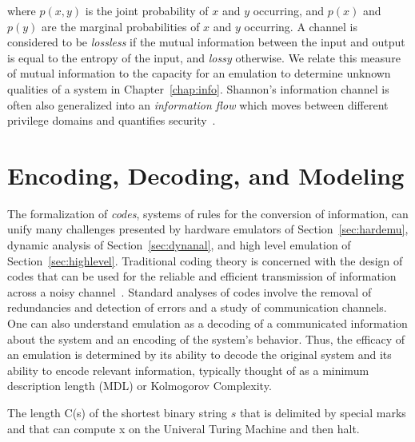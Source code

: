 \noindent
where $p(x,y)$ is the joint probability of $x$ and $y$ occurring, and $p(x)$ and $p(y)$ are the marginal probabilities of $x$ and $y$ occurring.
A channel is considered to be \emph{lossless} if the mutual information between the input and output is equal to the entropy of the input, and \emph{lossy} otherwise.
We relate this measure of mutual information to the capacity for an emulation to determine unknown qualities of a system in Chapter~\ref{chap:info}.
Shannon's information channel is often also generalized into an \emph{information flow} which moves between different privilege domains and quantifies security~\cite{sabelfeld2003language, lowe2002quantifying}.

\section{Encoding, Decoding, and Modeling}
\label{sec:encdec}

The formalization of \emph{codes}, systems of rules for the conversion of information, can unify many challenges presented by hardware emulators of Section~\ref{sec:hardemu}, dynamic analysis of Section~\ref{sec:dynanal}, and high level emulation of Section~\ref{sec:highlevel}.
Traditional coding theory is concerned with the design of codes that can be used for the reliable and efficient transmission of information across a noisy channel~\cite{van1971coding, richardson2008modern, bierbrauer2016introduction}.
Standard analyses of codes involve the removal of redundancies and detection of errors and a study of communication channels.
One can also understand emulation as a decoding of a communicated information about the system and an encoding of the system's behavior.
Thus, the efficacy of an emulation is determined by its ability to decode the original system and its ability to encode relevant information, typically thought of as a minimum description length (MDL) or Kolmogorov Complexity.

\begin{definition}
The length C(s) of the shortest binary string $s$ that is delimited by special marks and that can compute x on the Univeral Turing Machine and then halt.
\end{definition}

